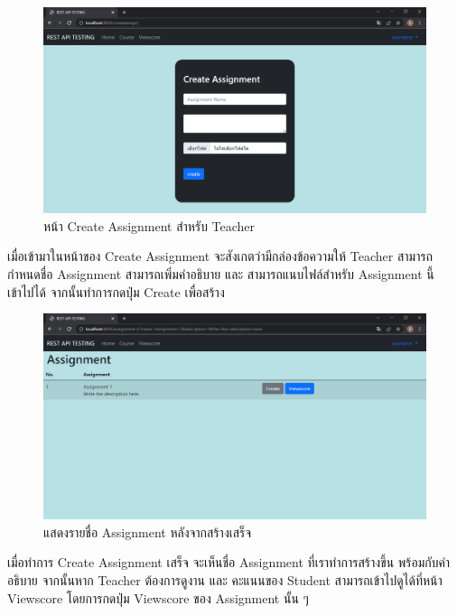\begin{figure}[H]
    \captionsetup{justification=centering}
    \centering
    \includegraphics[width=5in]{figures/chapter4/createassign.PNG}
    \caption{หน้า Create Assignment สำหรับ Teacher}
    \label{figure:createassign}
\end{figure}
เมื่อเข้ามาในหน้าของ Create Assignment จะสังเกตว่ามีกล่องข้อความให้ Teacher \mbox{สามารถ}กำหนดชื่อ Assignment สามารถเพิ่มคำอธิบาย และ สามารถแนบไฟล์สำหรับ Assignment นี้ เข้าไปได้ จากนั้นทำการกดปุ่ม Create เพื่อสร้าง
\newpage

\begin{figure}[H]
    \captionsetup{justification=centering}
    \centering
    \includegraphics[width=5in]{figures/chapter4/assign1.PNG}
    \caption{แสดงรายชื่อ Assignment หลังจากสร้างเสร็จ}
    \label{figure:assign2}
\end{figure}
เมื่อทำการ Create Assignment เสร็จ จะเห็นชื่อ Assignment ที่เราทำการสร้างขึ้น พร้อมกับคำอธิบาย จากนั้นหาก Teacher ต้องการดูงาน และ คะแนนของ Student สามารถเข้าไปดูได้ที่หน้า Viewscore โดยการกดปุ่ม Viewscore ของ Assignment นั้น ๆ

